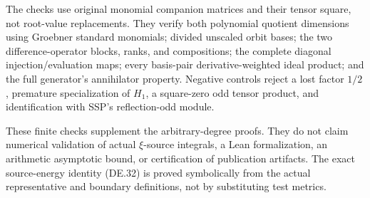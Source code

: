 The checks use original monomial companion matrices and their tensor square, not root-value replacements. They verify both polynomial quotient dimensions using Groebner standard monomials; divided unscaled orbit bases; the two difference-operator blocks, ranks, and compositions; the complete diagonal injection/evaluation maps; every basis-pair derivative-weighted ideal product; and the full generator's annihilator property. Negative controls reject a lost factor \(1/2\), premature specialization of \(H_1\), a square-zero odd tensor product, and identification with SSP's reflection-odd module.

These finite checks supplement the arbitrary-degree proofs. They do not claim numerical validation of actual \(\xi\)-source integrals, a Lean formalization, an arithmetic asymptotic bound, or certification of publication artifacts. The exact source-energy identity (DE.32) is proved symbolically from the actual representative and boundary definitions, not by substituting test metrics.

